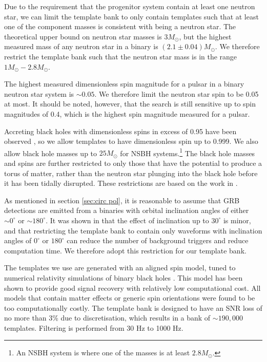 \documentclass[11pt]{cuthesis}
\begin{document}
Due to the requirement that the progenitor system contain at least one neutron star, we can limit the template bank to only contain templates such that at least one of the component masses is consistent with being a neutron star. The theoretical upper bound on neutron star masses is $3M_\odot$, \cite{Kalogera_1996} but the highest measured mass of any neutron star in a binary is $(2.1\pm 0.04)M_\odot$. \cite{Antoniadis1233232} We therefore restrict the template bank such that the neutron star mass is in the range $1M_\odot-2.8M_\odot$. 

The highest measured dimensionless spin magnitude for a pulsar in a binary neutron star system is $\sim 0.05$. \cite{Burgay:2003jj,PhysRevD.86.084017} We therefore limit the neutron star spin to be 0.05 at most. It should be noted, however, that the search is still sensitive up to spin magnitudes of 0.4, \cite{nitz_thesis} which is the highest spin magnitude measured for a pulsar. \cite{Hessels1901}

Accreting black holes with dimensionless spins in excess of 0.95 have been observed \cite{MILLER20151}, so we allow templates to have dimensionless spin up to 0.999. We also allow black hole masses up to $25M_\odot$ for NSBH systems.\footnote{An NSBH system is where one of the masses is at least $2.8M_\odot$.} The black hole masses and spins are further restricted to only those that have the potential to produce a torus of matter, rather than the neutron star plunging into the black hole before it has been tidally disrupted. These restrictions are based on the work in \cite{Pannarale_2014}. 

As mentioned in section \ref{sec:circ pol}, it is reasonable to assume that GRB detections are emitted from a binaries with orbital inclination angles of either $\sim0^\circ$ or $\sim180^\circ$. It was shown in \cite{pygrb_Williamson:2014} that the effect of inclination up to $30^\circ$ is minor, and that restricting the template bank to contain only waveforms with inclination angles of $0^\circ$ or $180^\circ$ can reduce the number of background triggers and reduce computation time. We therefore adopt this restriction for our template bank.

The templates we use are generated with an aligned spin model, tuned to numerical relativity simulations of binary black holes \cite{phenom_Khan:2015}. This model has been shown to provide good signal recovery with relatively low computational cost. All models that contain matter effects or generic spin orientations were found to be too computationally costly. \cite{o2grb} The template bank is designed to have an SNR loss of no more than 3\% due to discretisation, \cite{o1grb} which results in a bank of $\sim 190,000$ templates. Filtering is performed from 30 Hz to 1000 Hz. 
\end{document}
